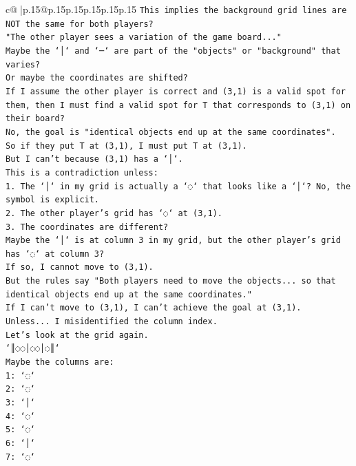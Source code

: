 \documentclass{article}
\begin{document}
{\begin{supertabular}{c@{$\;$}|p{.15\linewidth}@{}p{.15\linewidth}p{.15\linewidth}p{.15\linewidth}p{.15\linewidth}p{.15\linewidth}}
{{{\texttt{This implies the background grid lines are NOT the same for both players?} \\
\texttt{"The other player sees a variation of the game board..."} \\
\texttt{Maybe the `│` and `─` are part of the "objects" or "background" that varies?} \\
\texttt{Or maybe the coordinates are shifted?} \\
\texttt{If I assume the other player is correct and (3,1) is a valid spot for them, then I must find a valid spot for T that corresponds to (3,1) on their board?} \\
\texttt{No, the goal is "identical objects end up at the same coordinates".} \\
\texttt{So if they put T at (3,1), I must put T at (3,1).} \\
\texttt{But I can't because (3,1) has a `│`.} \\
\texttt{This is a contradiction unless:} \\
\texttt{1. The `│` in my grid is actually a `◌` that looks like a `│`? No, the symbol is explicit.} \\
\texttt{2. The other player's grid has `◌` at (3,1).} \\
\texttt{3. The coordinates are different?} \\
\texttt{Maybe the `│` is at column 3 in my grid, but the other player's grid has `◌` at column 3?} \\
\texttt{If so, I cannot move to (3,1).} \\
\texttt{But the rules say "Both players need to move the objects... so that identical objects end up at the same coordinates."} \\
\texttt{If I can't move to (3,1), I can't achieve the goal at (3,1).} \\
\texttt{Unless... I misidentified the column index.} \\
\texttt{Let's look at the grid again.} \\
\texttt{`║◌◌│◌◌│◌║`} \\
\texttt{Maybe the columns are:} \\
\texttt{1: `◌`} \\
\texttt{2: `◌`} \\
\texttt{3: `│`} \\
\texttt{4: `◌`} \\
\texttt{5: `◌`} \\
\texttt{6: `│`} \\
\texttt{7: `◌`} \\
}}}
\end{supertabular}}
\end{document}

